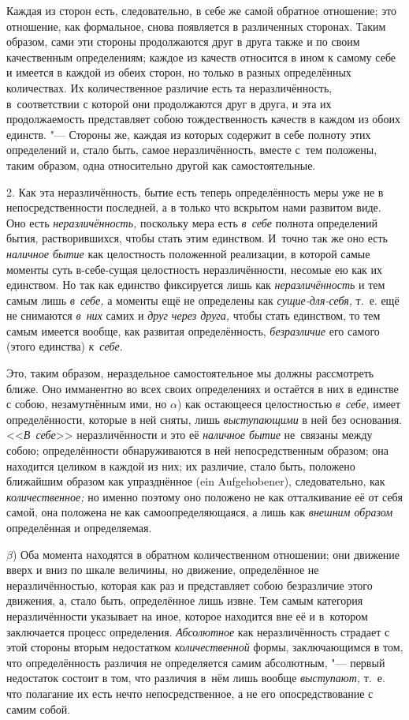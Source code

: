 Каждая из сторон есть, следовательно, в себе же самой обратное отношение; это
отношение, как формальное, снова появляется в различенных сторонах. Таким
образом, сами эти стороны продолжаются друг в друга также и по своим
качественным определениям; каждое из качеств относится в ином к самому себе и
имеется в каждой из обеих сторон, но только в разных определённых количествах.
Их количественное различие есть та неразличённость, в~соответствии с которой
они продолжаются друг в друга, и эта их продолжаемость представляет собою
тождественность качеств в каждом из обоих единств. "--- Стороны же, каждая из
которых содержит в себе полноту этих определений и, стало быть, самое
неразличённость, вместе с~тем положены, таким образом, одна относительно
другой как самостоятельные.

2. Как эта неразличённость, бытие есть теперь определённость меры уже не в
непосредственности последней, а в только что вскрытом нами развитом виде. Оно
есть {\em неразличённость,} поскольку мера есть {\em в~себе} полнота
определений бытия, растворившихся, чтобы стать этим единством. И~точно так же
оно есть {\em наличное бытие} как целостность положенной реализации, в которой
самые моменты суть в-себе-сущая целостность неразличённости, несомые ею как их
единством. Но так как единство фиксируется лишь как {\em неразличённость} и тем
самым лишь {\em в~себе,} а моменты ещё не определены как {\em сущие-для-себя,}
т.~е. ещё не снимаются {\em в~них} самих и {\em друг через друга,} чтобы стать
единством, то тем самым имеется вообще, как развитая определённость, {\em
безразличие} его самого (этого единства) {\em к~себе}.

Это, таким образом, нераздельное самостоятельное мы должны рассмотреть ближе.
Оно имманентно во всех своих определениях и остаётся в них в единстве с собою,
незамутнённым ими, но $\alpha$) как остающееся целостностью {\em в~себе,} имеет
определённости, которые в ней сняты, лишь {\em выступающими} в ней без
основания. <<{\em В~себе}>> неразличённости и это её {\em наличное бытие}
не~связаны между собою; определённости обнаруживаются в ней непосредственным
образом; она находится целиком в каждой из них; их различие, стало быть,
положено ближайшим образом как упразднённое (ein Auf\-ge\-ho\-be\-ner),
следовательно, как {\em количественное;} но именно поэтому оно положено не как
отталкивание её от себя самой, она положена не как самоопределяющаяся, а лишь
как {\em внешним образом} определённая и определяемая.

$\beta$) Оба момента находятся в обратном количественном отношении; они
движение вверх и вниз по шкале величины, но движение, определённое не
неразличённостью, которая как раз и представляет собою безразличие этого
движения, а, стало быть, определённое лишь извне. Тем самым категория
неразличённости указывает на иное, которое находится вне её и
в~котором заключается процесс определения. {\em Абсолютное} как неразличённость
страдает с этой стороны вторым недостатком {\em количественной} формы,
заключающимся в том, что определённость различия не определяется самим
абсолютным, "--- первый недостаток состоит в том, что различия в~нём лишь
вообще {\em выступают,} т.~е. что полагание их есть нечто непосредственное, а
не его опосредствование с самим собой.

